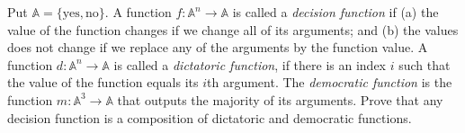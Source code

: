 Put $\mathbb{A}=\{ \mathrm{yes}, \mathrm{no} \}$. A function $f\colon \mathbb{A}^n\rightarrow \mathbb{A}$ is called a \textit{decision function} if
(a) the value of the function changes if we change all of its arguments; and
(b) the values does not change if we replace any of the arguments by the function value.
A function $d\colon \mathbb{A}^n \rightarrow \mathbb{A}$ is called a \textit{dictatoric function}, if there is an index $i$ such that the value of the function equals its $i$th argument.
The \textit{democratic function} is the function $m\colon \mathbb{A}^3 \rightarrow \mathbb{A}$ that outputs the majority of its arguments.
Prove that any decision function is a composition of dictatoric and democratic functions.